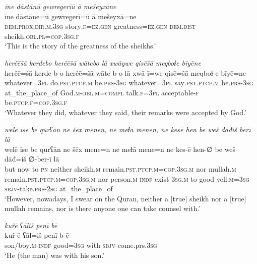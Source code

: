 \ea \label{ZB.58}
\textit{īne dāstānū gewregerīū ā mešeyxāne} \\ 
\gll īne dāstāne=ū gewregerī=ū ā mešeyxā=ne \\ 
 \textsc{dem.prox}\textsc{.dir}\textsc{.m}\textsc{.3sg} story\textsc{.f}\textsc{\textsc{=ez.gen}} greatness\textsc{\textsc{=ez.gen}} \textsc{dem.dist} sheikh\textsc{.obl}\textsc{.pl}\textsc{=cop}\textsc{.3sg}\textsc{.f} \\ 
\glt `This is the story of the greatness of the sheikhs.'
\z 
 
\ea \label{ZB.59}
\textit{herčēšā kerdebo herčēšā wātebo lā xwāywe qisēšā meqboɫe bīyēne} \\ 
\gll herčē=šā kerde b-o herčē=šā wāte b-o lā xwā-ī=we qisē=šā meqboɫ-e bīyē=ne \\ 
 whatever\textsc{=3pl} do\textsc{.pst}\textsc{.ptcp}\textsc{.m} be\textsc{.prs}\textsc{-3sg} whatever\textsc{=3pl} say\textsc{.pst}\textsc{.ptcp}\textsc{.m} be\textsc{.prs}\textsc{-3sg} at\_the\_place\_of God\textsc{.m}\textsc{-obl}\textsc{.m}\textsc{=compl} talk\textsc{.f}\textsc{=3pl} acceptable\textsc{-f} be\textsc{.ptcp}\textsc{.f}\textsc{=cop}\textsc{.3sg}\textsc{.f} \\ 
\glt `Whatever they did, whatever they said, their remarks were accepted by God.'
\z 
 
\ea \label{ZB.60}
\textit{welē īse be qurʕān ne šēx menen, ne meɫā menen, ne kesē hen be weš dāđiš berī lā} \\ 
\gll welē īse be qurʕān ne šēx mene=n ne meɫā mene=n ne kes-ē hen-∅ be weš dāđ=iš ∅-ber-ī lā \\ 
 but now to \textsc{pn} neither sheikh\textsc{.m} remain\textsc{.pst}\textsc{.ptcp}\textsc{.m}\textsc{=cop}\textsc{.3sg}\textsc{.m} nor mullah\textsc{.m} remain\textsc{.pst}\textsc{.ptcp}\textsc{.m}\textsc{=cop}\textsc{.3sg}\textsc{.m} nor person\textsc{.m}\textsc{-indf} exist\textsc{-3sg}\textsc{.m} to good yell\textsc{.m}\textsc{=3sg} \textsc{sbjv-}take\textsc{.prs}-\textsc{2sg} at\_the\_place\_of \\ 
\glt `However, nowadays, I swear on the Quran, neither a [true] sheikh nor a [true] mullah remains, nor is there anyone one can take counsel with.'
\z 
 
\ea \label{ZQ.3}
\textit{kuřē ʕāliš penī bē} \\ 
\gll kuř-ē ʕāl=iš penī b-ē \\ 
 son/boy\textsc{.m}\textsc{-indf} good\textsc{=3sg} with \textsc{sbjv-}come.prs\textsc{.3sg} \\ 
\glt `He (the man) was with his son.'
\z 
 
